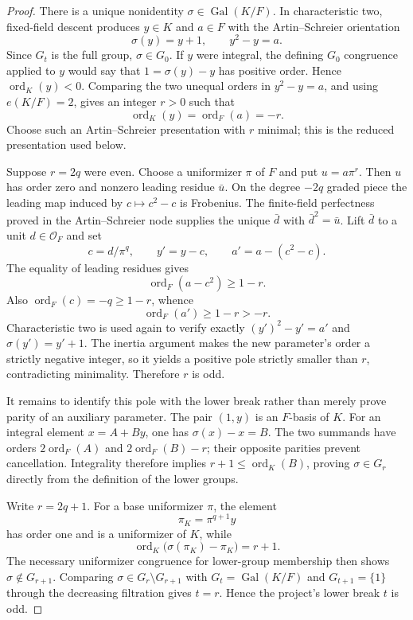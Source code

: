 \begin{proof}
There is a unique nonidentity $\sigma\in\operatorname{Gal}(K/F)$.  In
characteristic two, fixed-field descent produces $y\in K$ and $a\in F$ with
the Artin--Schreier orientation
\[
 \sigma(y)=y+1,\qquad y^2-y=a.
\]
Since $G_t$ is the full group, $\sigma\in G_0$.  If $y$ were integral, the
defining $G_0$ congruence applied to $y$ would say that $1=\sigma(y)-y$ has
positive order.  Hence $\operatorname{ord}_K(y)<0$.  Comparing the two
unequal orders in $y^2-y=a$, and using $e(K/F)=2$, gives an integer $r>0$
such that
\[
 \operatorname{ord}_K(y)=\operatorname{ord}_F(a)=-r.
\]
Choose such an Artin--Schreier presentation with $r$ minimal; this is the
reduced presentation used below.

Suppose $r=2q$ were even.  Choose a uniformizer $\pi$ of $F$ and put
$u=a\pi^r$.  Then $u$ has order zero and nonzero leading residue
$\bar u$.  On the degree $-2q$ graded piece the leading map induced by
$c\mapsto c^2-c$ is Frobenius.  The finite-field perfectness proved in the
Artin--Schreier node supplies the unique $\bar d$ with
$\bar d^2=\bar u$.  Lift $\bar d$ to a unit $d\in\mathcal O_F$ and set
\[
 c=d/\pi^q,\qquad y'=y-c,
 \qquad a'=a-(c^2-c).
\]
The equality of leading residues gives
\[
 \operatorname{ord}_F(a-c^2)\geq 1-r.
\]
Also $\operatorname{ord}_F(c)=-q\geq1-r$, whence
\[
 \operatorname{ord}_F(a')\geq1-r>-r.
\]
Characteristic two is used again to verify exactly
$(y')^2-y'=a'$ and $\sigma(y')=y'+1$.  The inertia argument makes the new
parameter's order a strictly negative integer, so it yields a positive pole
strictly smaller than $r$, contradicting minimality.  Therefore $r$ is odd.

It remains to identify this pole with the lower break rather than merely
prove parity of an auxiliary parameter.  The pair $(1,y)$ is an $F$-basis
of $K$.  For an integral element $x=A+By$, one has
$\sigma(x)-x=B$.  The two summands have orders $2\operatorname{ord}_F(A)$
and $2\operatorname{ord}_F(B)-r$; their opposite parities prevent
cancellation.  Integrality therefore implies
$r+1\leq\operatorname{ord}_K(B)$, proving $\sigma\in G_r$ directly from the
definition of the lower groups.

Write $r=2q+1$.  For a base uniformizer $\pi$, the element
\[
 \pi_K=\pi^{q+1}y
\]
has order one and is a uniformizer of $K$, while
\[
 \operatorname{ord}_K\bigl(\sigma(\pi_K)-\pi_K\bigr)=r+1.
\]
The necessary uniformizer congruence for lower-group membership then shows
$\sigma\notin G_{r+1}$.  Comparing
$\sigma\in G_r\setminus G_{r+1}$ with
$G_t=\operatorname{Gal}(K/F)$ and $G_{t+1}=\{1\}$ through the decreasing
filtration gives $t=r$.  Hence the project's lower break $t$ is odd.
\end{proof}
